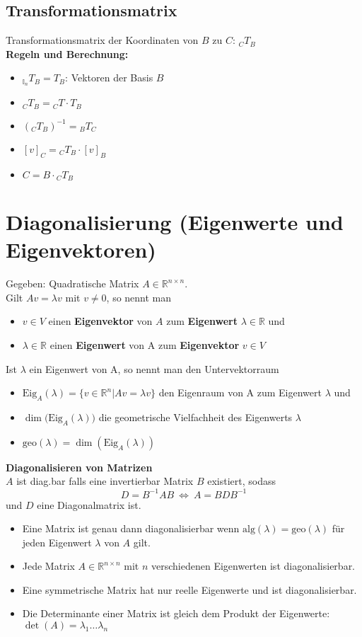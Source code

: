 \documentclass[german, 6pt]{latex4ei/latex4ei_sheet}
\begin{document}
\subsection{Transformationsmatrix}
Transformationsmatrix der Koordinaten von $B$ zu $C$: $_CT_B$\\
\textbf{Regeln und Berechnung:}
\begin{itemize}\itemsep2pt
	\item $_{\mathbb{I}_n}T_B = T_B$: Vektoren der Basis $B$
	\item $_CT_B = {_CT} \cdot T_B$
	\item $(_CT_B)^{-1} = {_BT_C}$
	\item $[v]_C = {_CT_B}\cdot[v]_B$
	\item $C=B\cdot {_CT_B}$
\end{itemize}
\begin{minipage}{\columnwidth}
\section{Diagonalisierung (Eigenwerte und Eigenvektoren)}
Gegeben: Quadratische Matrix $A \in \mathbb{R}^{n\times n}$.\\
Gilt $Av = \lambda v$ mit $v\ne 0$, so nennt man
\begin{itemize}\itemsep0pt
\item $v\in V$ einen \textbf{Eigenvektor} von $A$ zum \textbf{Eigenwert} $\lambda \in \mathbb{R}$ und 
\item $\lambda \in \mathbb{R}$ einen \textbf{Eigenwert} von A zum \textbf{Eigenvektor} $v\in V$
\end{itemize}
Ist $\lambda$ ein Eigenwert von A, so nennt man den Untervektorraum
\begin{itemize}\itemsep0pt
\item $\text{Eig}_A(\lambda) = \{v \in \mathbb{R}^n | Av = \lambda v\}$ den Eigenraum von A zum Eigenwert $\lambda$ und
\item $\dim({\text{Eig}_A(\lambda))}$ die geometrische Vielfachheit des Eigenwerts $\lambda$
\item $\text{geo}(\lambda) = \dim(\text{Eig}_A(\lambda))$
\end{itemize}
\textbf{Diagonalisieren von Matrizen}\\
$A$ ist diag.bar falls eine invertierbar Matrix $B$ existiert, sodass
\begin{equation*}
D=B^{-1}AB \ \Leftrightarrow \ A=BDB^{-1}
\end{equation*}
und $D$ eine Diagonalmatrix ist.
\begin{itemize}\itemsep0pt
\item Eine Matrix ist genau dann diagonalisierbar wenn $\text{alg}(\lambda)=\text{geo}(\lambda)$ für jeden Eigenwert $\lambda$ von $A$ gilt.
\item Jede Matrix $A \in \mathbb{R}^{n\times n}$ mit $n$ verschiedenen Eigenwerten ist diagonalisierbar.
\item Eine symmetrische Matrix hat nur reelle Eigenwerte und ist diagonalisierbar.
\item Die Determinante einer Matrix ist gleich dem Produkt der Eigenwerte: $\det(A)=\lambda_1\dots\lambda_n$
\end{itemize}
\end{minipage}
\end{document}
